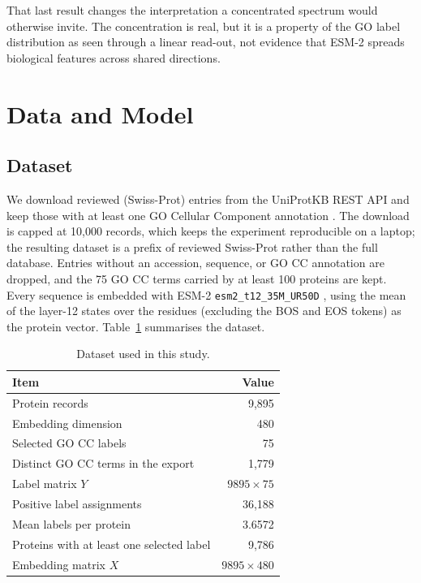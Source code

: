 \documentclass[11pt,a4paper]{article}
\begin{document}
That last result changes the interpretation a concentrated spectrum would
otherwise invite. The concentration is real, but it is a property of the GO label
distribution as seen through a linear read-out, not evidence that ESM-2 spreads
biological features across shared directions.

\section{Data and Model}

\subsection{Dataset}

We download reviewed (Swiss-Prot) entries from the UniProtKB REST API and keep
those with at least one GO Cellular Component annotation
\cite{uniprotEmbeddings,geneontology2021}. The
download is capped at 10{,}000 records, which keeps the experiment reproducible on a
laptop; the resulting dataset is a prefix of reviewed Swiss-Prot rather than the
full database. Entries without an accession, sequence, or GO CC annotation are
dropped, and the 75 GO CC terms carried by at least 100 proteins are kept. Every
sequence is embedded with ESM-2 \texttt{esm2\_t12\_35M\_UR50D} \cite{lin2023esm},
using the mean of the layer-12 states over the residues (excluding the BOS and EOS
tokens) as the protein vector. Table~\ref{tab:data} summarises the dataset.

\begin{table}[H]
\centering
\caption{Dataset used in this study.}
\label{tab:data}
\begin{tabular}{lr}
\toprule
Item & Value \\
\midrule
Protein records & 9{,}895 \\
Embedding dimension & 480 \\
Selected GO CC labels & 75 \\
Distinct GO CC terms in the export & 1{,}779 \\
Label matrix $Y$ & $9895 \times 75$ \\
Positive label assignments & 36{,}188 \\
Mean labels per protein & 3.6572 \\
Proteins with at least one selected label & 9{,}786 \\
Embedding matrix $X$ & $9895 \times 480$ \\
\bottomrule
\end{tabular}
\end{table}
\end{document}
